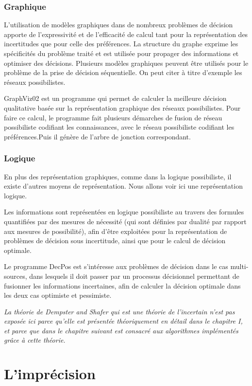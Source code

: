 \subsubsection{Graphique}
L’utilisation de modèles graphiques dans de nombreux problèmes de décision apporte de
l’expressivité et de l’efficacité de calcul tant pour la représentation des incertitudes que pour celle
des préférences. La structure du graphe exprime les spécificités du problème traité et est utilisée
pour propager des informations et optimiser des décisions. Plusieurs modèles graphiques peuvent
être utilisés pour le problème de la prise de décision séquentielle. On peut citer à titre d’exemple les réseaux possibilistes.

GraphViz02 est un programme qui permet de calculer la meilleure décision qualitative basée sur la représentation graphique des réseaux possibilistes. Pour faire ce calcul, le programme fait plusieurs démarches de fusion de réseau possibiliste codifiant les connaissances, avec le réseau possibiliste codifiant les préférences.Puis il génère de l’arbre de jonction correspondant.\cite{hkhaoulaThesis}
\subsubsection{Logique}
En plus des représentation graphiques, comme dans la logique possibiliste, il existe d’autres moyens de
représentation. Nous allons voir ici une représentation logique.

Les informations sont représentées en logique possibiliste au travers des formules quantifiées par des mesures de nécessité (qui sont définies par dualité par rapport aux mesures de possibilité), afin d'être exploitées pour la représentation de problèmes de décision sous incertitude, ainsi que pour le calcul de décision optimale.

Le programme DecPos est s'intéresse aux problèmes de décision dans le cas multi-sources, dans lesquels il doit passer par un processus décisionnel permettant de fusionner les informations incertaines, afin de calculer la décision optimale dans les deux cas optimiste et pessimiste.\cite{Noughithese}

\emph{ La théorie de Dempster and Shafer qui est une théorie de l'incertain n'est pas exposée ici parce qu’elle est présentée théoriquement en détail dans le chapitre I, et parce que dans le chapitre suivant est consacré aux algorithmes implémentés grâce à cette théorie.}
\section{L’imprécision}

